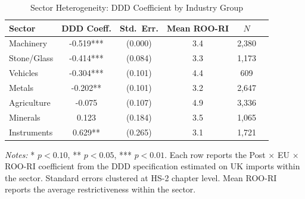 \begin{table}[H]
\centering
\caption{Sector Heterogeneity: DDD Coefficient by Industry Group}
\label{tab:sector}
\begin{threeparttable}
\begin{tabular}{lccccc}
\toprule
Sector & DDD Coeff. & Std.\ Err. & Mean ROO-RI & $N$ \\
\midrule
Machinery & -0.519*** & (0.000) & 3.4 & 2,380 \\
Stone/Glass & -0.414*** & (0.084) & 3.3 & 1,173 \\
Vehicles & -0.304*** & (0.101) & 4.4 & 609 \\
Metals & -0.202** & (0.101) & 3.2 & 2,647 \\
Agriculture & -0.075 & (0.107) & 4.9 & 3,336 \\
Minerals & 0.123 & (0.184) & 3.5 & 1,065 \\
Instruments & 0.629** & (0.265) & 3.1 & 1,721 \\
\bottomrule
\end{tabular}
\begin{tablenotes}[flushleft]
\small
\item \textit{Notes:} * $p<0.10$, ** $p<0.05$, *** $p<0.01$. Each row reports the Post $\times$ EU $\times$ ROO-RI coefficient from the DDD specification estimated on UK imports within the sector. Standard errors clustered at HS-2 chapter level. Mean ROO-RI reports the average restrictiveness within the sector.
\end{tablenotes}
\end{threeparttable}
\end{table}
